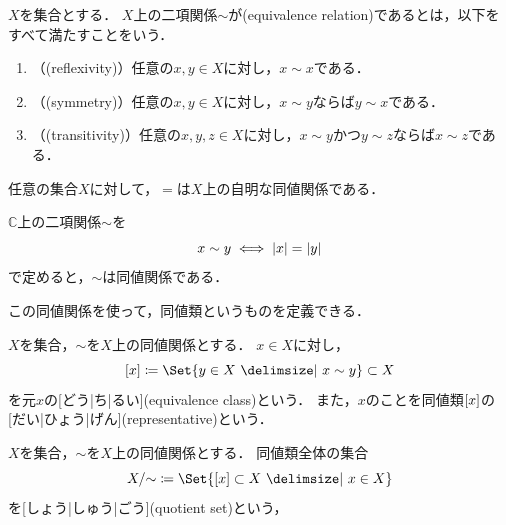 \documentclass[../sotsu.tex]{subfiles}
\begin{document}
\begin{definition}[同値関係]
    \label{dfn:equivalence-relation}
    $X$を集合とする．
    $X$上の二項関係$\sim$が(equivalence relation)であるとは，以下をすべて満たすことをいう．
    \begin{enumerate}
        \item （(reflexivity)）任意の$x, y \in X$に対し，$x \sim x$である．
        \item （(symmetry)）任意の$x, y \in X$に対し，$x \sim y$ならば$y \sim x$である．
        \item （(transitivity)）任意の$x, y, z \in X$に対し，$x \sim y$かつ$y \sim z$ならば$x \sim z$である．
    \end{enumerate}
\end{definition}

\begin{example}
    任意の集合$X$に対して，$=$は$X$上の自明な同値関係である．
\end{example}

\begin{example}
    $ℂ$上の二項関係$\sim$を
    \begin{equation*}
        x \sim y  \iff  \lvert x\rvert = \lvert y\rvert
    \end{equation*}
    で定めると，$\sim$は同値関係である．
\end{example}


この同値関係を使って，同値類というものを定義できる．

\begin{definition}[同値類]
    \label{dfn:equivalence-class}
    $X$を集合，$\sim$を$X$上の同値関係とする．
    $x \in X$に対し，
    \begin{equation}
        \eqclass{x}  \coloneq  \Set{ y \in X  \given  x \sim y } \subset X
    \end{equation}
    を元$x$の[どう|ち|るい](equivalence class)という．
    また，$x$のことを同値類$\lbrack x\rbrack$の[だい|ひょう|げん](representative)という．
\end{definition}

\begin{definition}[商集合]
    $X$を集合，$\sim$を$X$上の同値関係とする．
    同値類全体の集合
    \begin{equation}
        X/{\sim} \coloneq \Set{ \eqclass{x} \subset X  \given  x \in X }
    \end{equation}
    を[しょう|しゅう|ごう](quotient set)という，
\end{definition}
\end{document}
